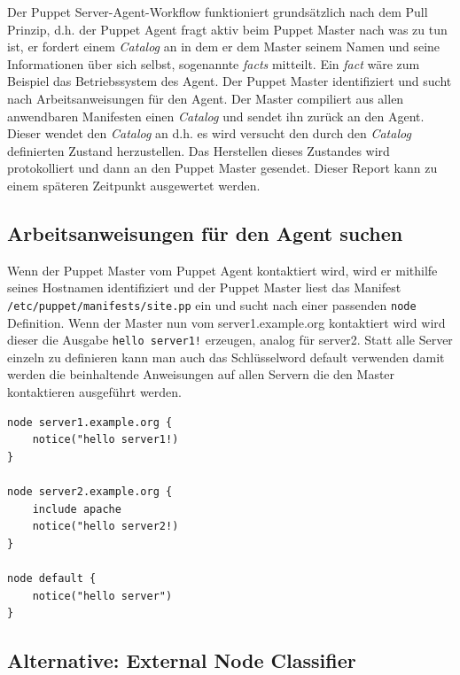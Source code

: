 \documentclass[12pt,a4paper,ngerman]{article}
\begin{document}
Der Puppet Server-Agent-Workflow funktioniert grundsätzlich nach dem Pull Prinzip, d.h. der Puppet Agent fragt aktiv beim Puppet Master nach was zu tun ist, er fordert einem \textit{Catalog} an in dem er dem Master seinem Namen und seine Informationen über sich selbst, sogenannte \textit{facts} mitteilt. Ein \textit{fact} wäre zum Beispiel das Betriebssystem des Agent. Der Puppet Master identifiziert und sucht nach Arbeitsanweisungen für den Agent. Der Master compiliert aus allen anwendbaren Manifesten einen \textit{Catalog} und sendet ihn zurück an den Agent. Dieser wendet den \textit{Catalog} an d.h. es wird versucht den durch den \textit{Catalog} definierten Zustand herzustellen. Das Herstellen dieses Zustandes wird protokolliert und dann an den Puppet Master gesendet. Dieser Report kann zu einem späteren Zeitpunkt ausgewertet werden.


\subsection{Arbeitsanweisungen für den Agent suchen}

Wenn der Puppet Master vom Puppet Agent kontaktiert wird, wird er mithilfe seines Hostnamen identifiziert und der Puppet Master liest das Manifest \lstinline$/etc/puppet/manifests/site.pp$ ein und sucht nach einer passenden \lstinline$node$ Definition. Wenn der Master nun vom server1.example.org kontaktiert wird wird dieser die Ausgabe \lstinline$hello server1!$ erzeugen, analog für server2. Statt alle Server einzeln zu definieren kann man auch das Schlüsselword default verwenden damit werden die beinhaltende Anweisungen auf allen Servern die den Master kontaktieren ausgeführt werden. 


\begin{lstlisting}[language=puppet,caption=Node Definitionen in /etc/puppet/manifests/site.pp, label=puppet-node-classifier]
node server1.example.org {
    notice("hello server1!)
}

node server2.example.org {
    include apache
    notice("hello server2!)
}

node default {
    notice("hello server")
}

\end{lstlisting}  

\subsection{Alternative: External Node Classifier}
     
\end{document}
